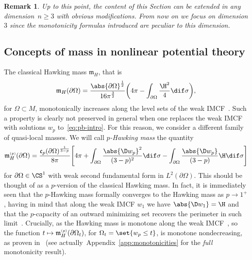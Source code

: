 \documentclass[10pt,a4paper]{amsart}
\numberwithin{equation}{section}
\newtheorem{Remark}[Theorem]{Remark} }
\renewcommand{\ncapa}{\mathfrak{c}}
\newcommand{\ma}{\mathfrak{m}}
\newcommand{\tp}[1][p]{{\text{\tiny$(#1)$}}}
\begin{document}
\begin{Remark}
Up to this point, the content of this Section can be extended in any dimension~${n \geq 3}$ with obvious modifications. From now on we focus on dimension $3$ since the monotonicity formulas introduced are peculiar to this dimension.
\end{Remark}

\subsection{Concepts of mass in nonlinear potential theory}
The classical Hawking mass $\ma_H$, that is
\begin{equation}\label{eq:hawking-mass}
 \ma_{H}(\partial \Omega)= \frac{ \abs{ \partial \Omega}^{\frac{1}{2}}}{16 \pi^{\frac{3}{2}}} \bigg( 4 \pi - \int_{\partial \Omega}\frac{\H^2}{4} \dif \sigma \bigg),
\end{equation}
for $\Omega\subset M$, monotonically increases along the level sets of the weak IMCF~\cite{huisken_inversemeancurvatureflow_2001}. Such a property is clearly not preserved in general when one replaces the weak IMCF with solutions $w_p$ to~\eqref{eq:pb-intro}. For this reason, we consider a different family of quasi-local masses. We will call \emph{$p$-Hawking mass} the quantity
\begin{equation}\label{eq:p-Hawkingmass}
 \ma_H^{\tp}(\partial \Omega) = \frac{\ncapa_p(\partial \Omega)^{\frac{1}{3-p}}}{8 \pi}\Bigg[4\pi + \int_{\partial \Omega}\frac{\abs{\D w_p}^2}{(3-p)^2}\dif \sigma - \int_{\partial \Omega}\frac{\abs{ \D w_p} }{(3-p)}\H \dif \sigma \Bigg]
\end{equation}
for $\partial \Omega \in \CS^{1}$ with weak second fundamental form in $L^2(\partial \Omega)$. This should be thought of as a $p$-version of the classical Hawking mass. In fact, it is immediately seen that the $p$-Hawking mass formally converges to the Hawking mass as $p \to 1^+$, having in mind that along the weak IMCF $w_1$ we have $\abs{\D w_1} = \H$ and that the $p$-capacity of an outward minimizing set recovers the perimeter in such limit~\cite[Theorem 1.2]{fogagnolo_minimisinghullscapacityisoperimetric_2022}.
Crucially, as the Hawking mass is monotone along the weak IMCF~\cite[Geroch Monotonicity Formula 5.8]{huisken_inversemeancurvatureflow_2001},
 so the function $t \mapsto \ma_H^{\tp}(\partial \Omega_t)$, for $\Omega_t= \set{w_p \leq t}$, is monotone nondecreasing, as proven in~\cite{agostiniani_riemannianpenroseinequalitynonlinear_2022} (see actually~Appendix~\ref{app:monotonicities} for the \emph{full} monotonicity result).
\end{document}

